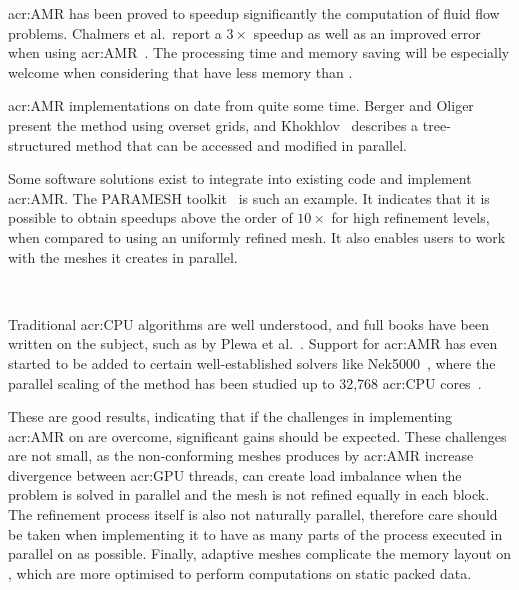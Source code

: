 \Acrshort{acr:AMR} has been proved to speedup significantly the computation of fluid flow problems.
Chalmers et al.\ report a \(3 \times \) speedup as well as an improved error when using
\acrshort{acr:AMR}~\cite{Chalmers2019}. The processing time and memory saving will be especially
welcome when considering that  have less memory than .

\Acrshort{acr:AMR} implementations on  date from quite some time. Berger and
Oliger~\cite{Berger1984} present the method using overset grids, and Khokhlov~\cite{Khokhlov1998}
describes a tree-structured method that can be accessed and modified in parallel.

Some software solutions exist to integrate into existing code and implement \acrlong{acr:AMR}. The
PARAMESH toolkit~\cite{MacNeice2000} is such an example. It indicates that it is possible to obtain
speedups above the order of \( 10 \times \) for high refinement levels, when compared to using an
uniformly refined mesh. It also enables users to work with the meshes it creates in parallel.

~\cite{Burstedde2011} %

Traditional \acrshort{acr:CPU} algorithms are well understood, and full books have been written on
the subject, such as by Plewa et al.~\cite{Plewa2005}. Support for \acrshort{acr:AMR} has even
started to be added to certain well-established solvers like Nek5000~\cite{Offermans2019}, where the
parallel scaling of the method has been studied up to 32,768 \acrshort{acr:CPU}
cores~\cite{Peplinski2016}. 

These are good results, indicating that if the challenges in implementing \acrshort{acr:AMR} on
 are overcome, significant gains should be expected. These challenges are not
small, as the non-conforming meshes produces by \acrshort{acr:AMR} increase divergence between
\acrshort{acr:GPU} threads, can create load imbalance when the problem is solved in parallel and the
mesh is not refined equally in each block. The refinement process itself is also not naturally
parallel, therefore care should be taken when implementing it to have as many parts of the process
executed in parallel on  as possible. Finally, adaptive meshes complicate the
memory layout on , which are more optimised to perform computations on static
packed data.

